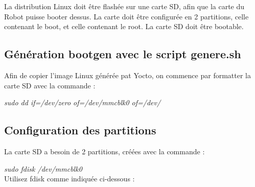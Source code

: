 La distribution Linux doit être flashée sur une carte SD, afin que la carte du Robot puisse booter dessus.
La carte doit être configurée en 2 partitions, celle contenant le boot, et celle contenant le root.
La carte SD doit être bootable.

\subsection{Génération bootgen avec le script genere.sh}
Afin de copier l'image Linux générée pat Yocto, on commence par formatter la carte SD avec la commande : 

\textit{sudo dd if=/dev/zero of=/dev/mmcblk0 of=/dev/
}
\subsection{Configuration des partitions}

La carte SD a besoin de 2 partitions, créées avec la commande : 

\textit{sudo fdisk /dev/mmcblk0
}
\\Utilisez fdisk comme indiquée ci-dessous : 


